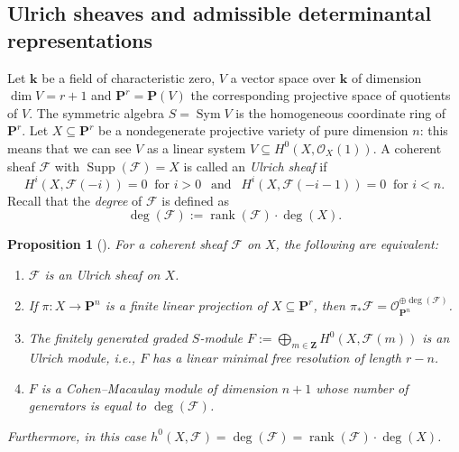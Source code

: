 \documentclass[12pt]{amsart}
\newcounter{thmcounter}
\numberwithin{equation}{section}
\numberwithin{thmcounter}{section}
\newtheorem{proposition}[thmcounter]{Proposition}
\theoremstyle{definition}
\theoremstyle{claim}
\newcommand{\kk}{\mathbf{k}}
\newcommand{\nP}{\mathbf{P}}
\newcommand{\sF}{\mathscr{F}}
\newcommand{\sO}{\mathscr{O}}
\DeclareMathOperator{\supp}{Supp}
\DeclareMathOperator{\Sym}{Sym}
\DeclareMathOperator{\rank}{rank}
\begin{document}
\subsection{Ulrich sheaves and admissible determinantal representations}
Let $\kk$ be a field of characteristic zero, $V$ a vector space over $\kk$ of dimension $\dim V=r+1$ and $\nP^r = \nP(V)$ the corresponding projective space of quotients of $V$. The symmetric algebra $S = \Sym V$ is the homogeneous coordinate ring of $\nP^r$. Let $X\subseteq \nP^r$ be a nondegenerate projective variety of pure dimension $n$: this means that we can see $V$ as a linear system $V \subseteq H^0(X,\sO_X(1))$.  A coherent sheaf $\mathscr{F}$ with $\supp(\mathscr{F})=X$ is called an \emph{Ulrich sheaf} if
$$
H^i(X, \mathscr{F}(-i))=0~\text{ for $i>0$}~~\text{ and }~~H^i(X, \mathscr{F}(-i-1))=0~\text{ for $i<n$}.
$$
Recall that the \emph{degree} of $\mathscr{F}$ is defined as
$$
\deg (\mathscr{F}):=\rank (\mathscr{F}) \cdot \deg(X).
$$

\begin{proposition}[{\cite[Proposition 2.1]{eisenbudschreyer}}]\label{prop:ulrich}
For a coherent sheaf $\mathscr{F}$ on $X$, the following are equivalent:
\begin{enumerate}
\item $\mathscr{F}$ is an Ulrich sheaf on $X$.
\item If $\pi \colon X \to \nP^n$ is a finite linear projection of $X \subseteq \nP^r$, then $\pi_* \mathscr{F} = \sO_{\nP^n}^{\oplus \deg(\sF)}$.
\item The finitely generated graded $S$-module $F:=\bigoplus_{m \in \mathbf{Z}} H^0(X, \mathscr{F}(m))$ is an Ulrich module, i.e., $F$
has a linear minimal free resolution of length $r-n$.
\item $F$ is a Cohen--Macaulay module of dimension $n+1$ whose number of generators is equal to $\deg(\mathscr{F})$.
\end{enumerate}
Furthermore, in this case $h^0(X, \mathscr{F}) = \deg(\mathscr{F}) = \rank{(\mathscr{F})}\cdot \deg(X)$.
\end{proposition}


\medskip
\end{document}
